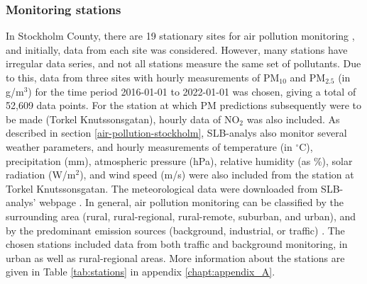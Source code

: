 \subsubsection{Monitoring stations}
In Stockholm County, there are 19 stationary sites for air pollution monitoring \cite{slb-matningar}, and initially, data from each site was considered. However, many stations have irregular data series, and not all stations measure the same set of pollutants. Due to this, data from three sites with hourly measurements of PM$_{10}$ and PM$_{2.5}$ (in \textmugreek g/m$^3$) for the time period 2016-01-01 to 2022-01-01 was chosen, giving a total of 52,609 data points. For the station at which PM predictions subsequently were to be made (Torkel Knutssonsgatan), hourly data of NO$_2$ was also included. As described in section \ref{air-pollution-stockholm}, SLB-analys also monitor several weather parameters, and hourly measurements of temperature (in $^\circ$C), precipitation (mm), atmospheric pressure (hPa), relative humidity (as \%), solar radiation (W/m$^2$), and wind speed (m/s) were also included from the station at Torkel Knutssonsgatan. The meteorological data were downloaded from SLB-analys' webpage \cite{slb-analys-meteorologi}. In general, air pollution monitoring can be classified by the surrounding area (rural, rural-regional, rural-remote, suburban, and urban), and by the predominant emission sources (background, industrial, or traffic) \cite{smhi-luftmatningar}. The chosen stations included data from both traffic and background monitoring, in urban as well as rural-regional areas. More information about the stations are given in Table \ref{tab:stations} in appendix \ref{chapt:appendix_A}. 

